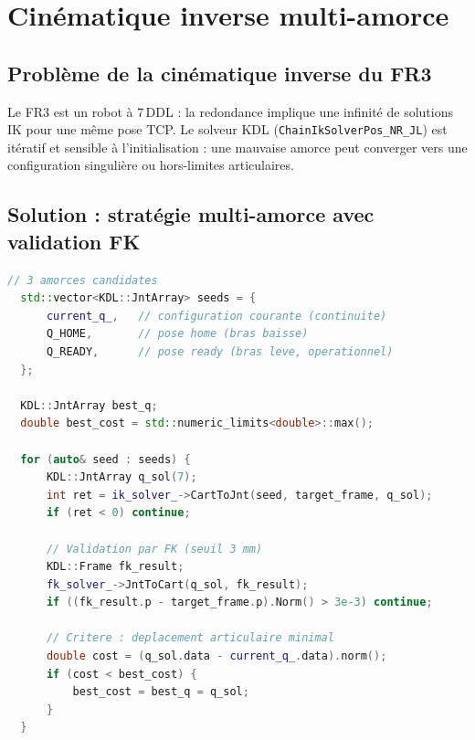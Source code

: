 \documentclass[11pt, a4paper]{article}
\begin{document}
\section{Cinématique inverse multi-amorce}

\subsection{Problème de la cinématique inverse du FR3}

Le FR3 est un robot à 7\,DDL : la redondance implique une infinité de solutions IK pour une même pose TCP. Le solveur KDL (\texttt{ChainIkSolverPos\_NR\_JL}) est itératif et sensible à l'initialisation : une mauvaise amorce peut converger vers une configuration singulière ou hors-limites articulaires.

\subsection{Solution : stratégie multi-amorce avec validation FK}

\begin{lstlisting}[language=cpp, caption={Extrait cartesian\_commander.cpp — IK multi-amorce}]
  // 3 amorces candidates
  std::vector<KDL::JntArray> seeds = {
      current_q_,   // configuration courante (continuite)
      Q_HOME,       // pose home (bras baisse)
      Q_READY,      // pose ready (bras leve, operationnel)
  };

  KDL::JntArray best_q;
  double best_cost = std::numeric_limits<double>::max();

  for (auto& seed : seeds) {
      KDL::JntArray q_sol(7);
      int ret = ik_solver_->CartToJnt(seed, target_frame, q_sol);
      if (ret < 0) continue;

      // Validation par FK (seuil 3 mm)
      KDL::Frame fk_result;
      fk_solver_->JntToCart(q_sol, fk_result);
      if ((fk_result.p - target_frame.p).Norm() > 3e-3) continue;

      // Critere : deplacement articulaire minimal
      double cost = (q_sol.data - current_q_.data).norm();
      if (cost < best_cost) {
          best_cost = best_q = q_sol;
      }
  }
\end{lstlisting}
\end{document}
